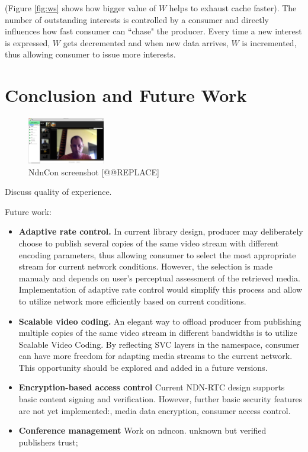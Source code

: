 \documentclass{icn/sig-alternate-2012} %
\newcommand{\ndnrtcName}{NDN-RTC} %
\newcommand{\ndnconName}{NdnCon}
\begin{document}
(Figure \ref{fig:ws} shows how bigger value of $W$ helps to exhaust cache faster). The number of outstanding interests is controlled by a consumer and directly influences how fast consumer can ``chase" the producer. Every time a new interest is expressed, $W$ gets decremented and when new data arrives, $W$ is incremented, thus allowing consumer to issue more interests.



\section{Conclusion and Future Work}
\label{sec:conclusion}


\begin{figure}[t!]
\centering
\includegraphics[width=0.3\textwidth]{ndncon}
\caption{\ndnconName{} screenshot [@@REPLACE]}
\label{fig:ndncon}
\end{figure}


Discuss quality of experience. 

Future work: 
\begin{itemize}[label={}]
\item \textbf{Adaptive rate control.} In current library design, producer may deliberately choose to publish several copies of the same video stream with different encoding parameters, thus allowing consumer to select the most appropriate stream for current network conditions. However, the selection is made manualy and depends on user's perceptual assessment of the retrieved media. Implementation of adaptive rate control would simplify this process and allow to utilize network more efficiently based on current conditions.

\item \textbf{Scalable video coding.} An elegant way to offload producer from publishing multiple copies of the same video stream in different bandwidths is to utilize Scalable Video Coding. By reflecting SVC layers in the namespace, consumer can have more freedom for adapting media streams to the current network. This opportunity should be explored and added in a future versions.

\item \textbf{Encryption-based access control} Current \ndnrtcName{} design supports basic content signing and verification. However, further basic security features are not yet implemented:, media data encryption, consumer access control.

\item \textbf{Conference management} 
Work on ndncon. unknown but verified publishers trust; 
\end{itemize}
\end{document}
